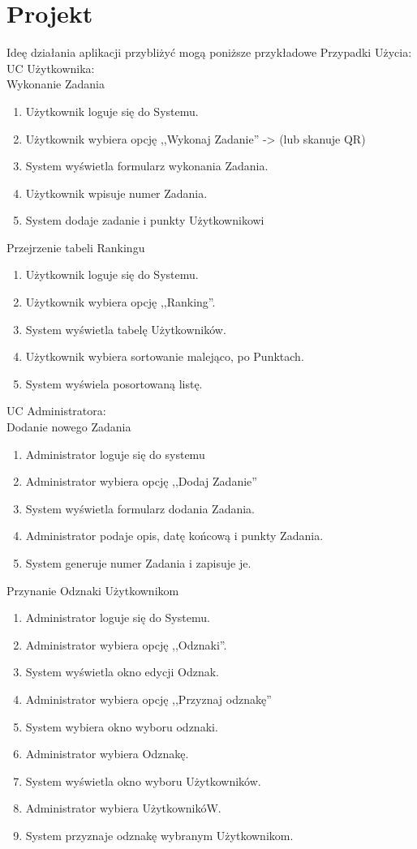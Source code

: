 \documentclass[a4paper,12pt,twoside,openany]{report}
\begin{document}
	\section{Projekt}
	Ideę działania aplikacji przybliżyć mogą poniższe przykładowe Przypadki Użycia:\\
	UC Użytkownika:\\
	Wykonanie Zadania
	\begin{enumerate}
		\item Użytkownik loguje się do Systemu.
		\item Użytkownik wybiera opcję ,,Wykonaj Zadanie'' -> (lub skanuje QR)
		\item System wyświetla formularz wykonania Zadania.
		\item Użytkownik wpisuje numer Zadania.
		\item System dodaje zadanie i punkty Użytkownikowi
	\end{enumerate}
	Przejrzenie tabeli Rankingu
	\begin{enumerate}
		\item Użytkownik loguje się do Systemu.
		\item Użytkownik wybiera opcję ,,Ranking''.
		\item System wyświetla tabelę Użytkowników.
		\item Użytkownik wybiera sortowanie malejąco, po Punktach.
		\item System wyświela posortowaną listę.
	\end{enumerate}
	UC Administratora:\\
	Dodanie nowego Zadania
	\begin{enumerate}
		\item Administrator loguje się do systemu
		\item Administrator wybiera opcję ,,Dodaj Zadanie''
		\item System wyświetla formularz dodania Zadania.
		\item Administrator podaje opis, datę końcową i punkty Zadania.
		\item System generuje numer Zadania i zapisuje je.
	\end{enumerate}
	Przynanie Odznaki Użytkownikom
	\begin{enumerate}
		\item Administrator loguje się do Systemu.
		\item Administrator wybiera opcję ,,Odznaki''.
		\item System wyświetla okno edycji Odznak.
		\item Administrator wybiera opcję ,,Przyznaj odznakę''
		\item System wybiera okno wyboru odznaki.
		\item Administrator wybiera Odznakę.
		\item System wyświetla okno wyboru Użytkowników.
		\item Administrator wybiera UżytkownikóW.
		\item System przyznaje odznakę wybranym Użytkownikom.
	\end{enumerate}
	
\end{document}
